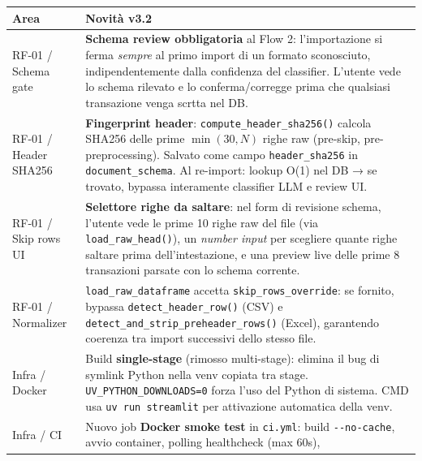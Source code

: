 \documentclass[11pt, a4paper]{article}
\begin{document}
\begin{center}
\small
\begin{longtable}{@{}L{3cm} L{10.5cm}@{}}
\toprule
\textbf{Area} & \textbf{Novità v3.2} \\
\midrule
\endhead
RF-01 / Schema gate     & \textbf{Schema review obbligatoria} al Flow 2: l'importazione si ferma
                           \emph{sempre} al primo import di un formato sconosciuto, indipendentemente
                           dalla confidenza del classifier. L'utente vede lo schema rilevato e
                           lo conferma/corregge prima che qualsiasi transazione venga scrtta nel DB. \\[3pt]
RF-01 / Header SHA256   & \textbf{Fingerprint header}: \texttt{compute\_header\_sha256()} calcola SHA256
                           delle prime $\min(30, N)$ righe raw (pre-skip, pre-preprocessing).
                           Salvato come campo \texttt{header\_sha256} in \texttt{document\_schema}.
                           Al re-import: lookup O(1) nel DB → se trovato, bypassa interamente
                           classifier LLM e review UI. \\[3pt]
RF-01 / Skip rows UI    & \textbf{Selettore righe da saltare}: nel form di revisione schema,
                           l'utente vede le prime 10 righe raw del file (via \texttt{load\_raw\_head()}),
                           un \emph{number input} per scegliere quante righe saltare prima
                           dell'intestazione, e una preview live delle prime 8 transazioni
                           parsate con lo schema corrente. \\[3pt]
RF-01 / Normalizer      & \texttt{load\_raw\_dataframe} accetta \texttt{skip\_rows\_override}:
                           se fornito, bypassa \texttt{detect\_header\_row()} (CSV) e
                           \texttt{detect\_and\_strip\_preheader\_rows()} (Excel), garantendo
                           coerenza tra import successivi dello stesso file. \\[3pt]
Infra / Docker          & Build \textbf{single-stage} (rimosso multi-stage): elimina il bug di
                           symlink Python nella venv copiata tra stage. \texttt{UV\_PYTHON\_DOWNLOADS=0}
                           forza l'uso del Python di sistema. CMD usa \texttt{uv run streamlit}
                           per attivazione automatica della venv. \\[3pt]
Infra / CI              & Nuovo job \textbf{Docker smoke test} in \texttt{ci.yml}:
                           build \texttt{-{}-no-cache}, avvio container, polling healthcheck (max 60s),

\end{longtable}
\end{center}
\end{document}
